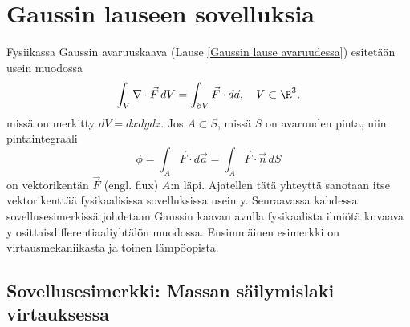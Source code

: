 \section{Gaussin lauseen sovelluksia} \label{Gaussin lauseen sovelluksia}
\alku

Fysiikassa Gaussin avaruuskaava (Lause \ref{Gaussin lause avaruudessa}) esitetään usein
muodossa
\[
\int_V \nabla\cdot\vec F\,dV=\int_{\partial V} \vec F\cdot d\vec a,\quad V\subset\R^3,
\]
missä on merkitty $dV=dxdydz$. Jos $A \subset S$, missä $S$ on avaruuden pinta, niin
pintaintegraali
\begin{equation} \label{vuokaava}
\phi=\int_A \vec F\cdot d\vec a = \int_A \vec F\cdot\vec n\,dS \tag{$\star$}
\end{equation}
%
on vektorikentän $\vec F$  (engl. flux) $A$:n läpi. Ajatellen tätä yhteyttä
sanotaan itse vektorikenttää fysikaalisissa sovelluksissa usein y.
Seuraavassa kahdessa sovellusesimerkissä johdetaan Gaussin kaavan avulla fysikaalista ilmiötä
kuvaava y osittaisdifferentiaaliyhtälön muodossa. Ensimmäinen esimerkki
on virtausmekaniikasta ja toinen lämpöopista.

\subsection*{Sovellusesimerkki: Massan säilymislaki virtauksessa}

